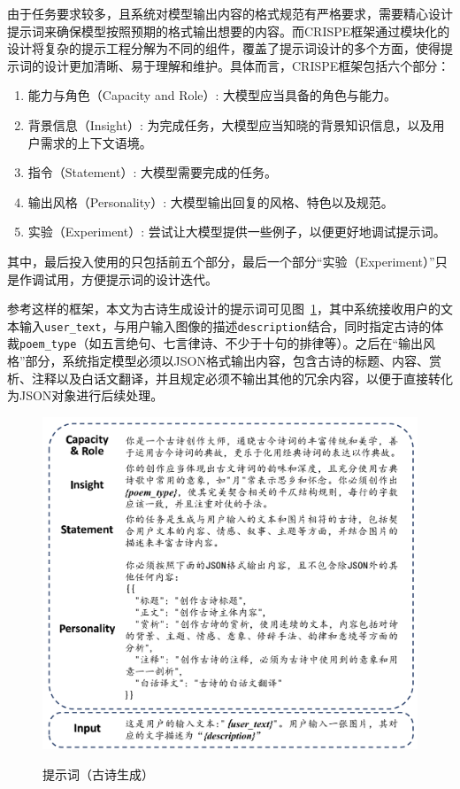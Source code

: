 由于任务要求较多，且系统对模型输出内容的格式规范有严格要求，需要精心设计提示词来确保模型按照预期的格式输出想要的内容。而CRISPE框架通过模块化的设计将复杂的提示工程分解为不同的组件，覆盖了提示词设计的多个方面，使得提示词的设计更加清晰、易于理解和维护。具体而言，CRISPE框架包括六个部分：
\begin{enumerate}
  \item 能力与角色（Capacity and Role）: 大模型应当具备的角色与能力。
  \item 背景信息（Insight）: 为完成任务，大模型应当知晓的背景知识信息，以及用户需求的上下文语境。
  \item 指令（Statement）: 大模型需要完成的任务。
  \item 输出风格（Personality）: 大模型输出回复的风格、特色以及规范。
  \item 实验（Experiment）: 尝试让大模型提供一些例子，以便更好地调试提示词。
\end{enumerate}

其中，最后投入使用的只包括前五个部分，最后一个部分“实验（Experiment）”只是作调试用，方便提示词的设计迭代。

参考这样的框架，本文为古诗生成设计的提示词可见图~\ref{fig:prompt_poem_generation}，其中系统接收用户的文本输入\verb|user_text|，与用户输入图像的描述\verb|description|结合，同时指定古诗的体裁\verb|poem_type|（如五言绝句、七言律诗、不少于十句的排律等）。之后在“输出风格”部分，系统指定模型必须以JSON格式输出内容，包含古诗的标题、内容、赏析、注释以及白话文翻译，并且规定必须不输出其他的冗余内容，以便于直接转化为JSON对象进行后续处理。

\begin{figure}[ht]
  \centering
  \includegraphics[width=1\textwidth]
  {figures/Prompt_古诗生成.pdf}\\
  \caption{提示词（古诗生成）}
  \label{fig:prompt_poem_generation} %
\end{figure}


